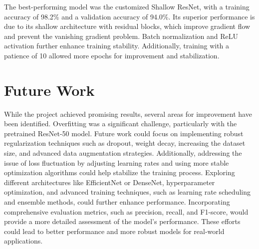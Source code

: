 \documentclass[12pt]{article}
\begin{document}
The best-performing model was the customized Shallow ResNet, with a training accuracy of 98.2\% and a validation accuracy of 94.0\%. Its superior performance is due to its shallow architecture with residual blocks, which improve gradient flow and prevent the vanishing gradient problem. Batch normalization and ReLU activation further enhance training stability. Additionally, training with a patience of 10 allowed more epochs for improvement and stabilization.


\section*{Future Work}

While the project achieved promising results, several areas for improvement have been identified. Overfitting was a significant challenge, particularly with the pretrained ResNet-50 model. Future work could focus on implementing robust regularization techniques such as dropout, weight decay, increasing the dataset size, and advanced data augmentation strategies. Additionally, addressing the issue of loss fluctuation by adjusting learning rates and using more stable optimization algorithms could help stabilize the training process. Exploring different architectures like EfficientNet or DenseNet, hyperparameter optimization, and advanced training techniques, such as learning rate scheduling and ensemble methods, could further enhance performance. Incorporating comprehensive evaluation metrics, such as precision, recall, and F1-score, would provide a more detailed assessment of the model's performance. These efforts could lead to better performance and more robust models for real-world applications.
\end{document}
